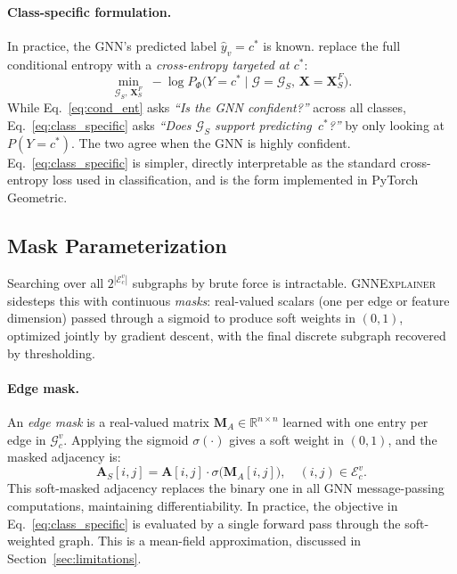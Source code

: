 \documentclass{article}
\newcommand{\GNNEx}{\textsc{GNNExplainer}\xspace}
\newcommand{\reals}{\mathbb{R}}
\newcommand{\calG}{\mathcal{G}}
\newcommand{\calE}{\mathcal{E}}
\newcommand{\bfA}{\mathbf{A}}
\newcommand{\bfX}{\mathbf{X}}
\newcommand{\bfM}{\mathbf{M}}
\newcommand{\sigmoid}{\sigma}
\theoremstyle{definition}
\begin{document}
\paragraph{Class-specific formulation.}
In practice, the GNN's predicted label $\hat{y}_v = c^*$ is known.
\citet{ying2019gnnexplainer} replace the full conditional entropy with a
\emph{cross-entropy targeted at $c^*$}:
\begin{equation}
  \min_{\calG_S,\, \bfX_S^F}\;
  -\log P_\Phi\bigl(Y\!=\!c^* \mid \calG\!=\!\calG_S,\,
  \bfX\!=\!\bfX_S^F\bigr).
  \label{eq:class_specific}
\end{equation}
While Eq.~\eqref{eq:cond_ent} asks \emph{``Is the GNN confident?''} across all
classes, Eq.~\eqref{eq:class_specific} asks \emph{``Does $\calG_S$ support
predicting~$c^*$?''} by only looking at $P(Y\!=\!c^*)$. The two agree when
the GNN is highly confident. Eq.~\eqref{eq:class_specific} is simpler,
directly interpretable as the standard cross-entropy loss used in
classification, and is the form implemented in PyTorch Geometric.

\subsection{Mask Parameterization}
\label{subsec:maskparam}

Searching over all $2^{|\calE_c^v|}$ subgraphs by brute force is intractable.
\GNNEx sidesteps this with continuous \emph{masks}: real-valued scalars (one
per edge or feature dimension) passed through a sigmoid to produce soft
weights in $(0,1)$, optimized jointly by gradient descent, with the final
discrete subgraph recovered by thresholding.

\paragraph{Edge mask.}
An \emph{edge mask} is a real-valued matrix $\bfM_A \in \reals^{n \times n}$
learned with one entry per edge in $\calG_c^v$. Applying the sigmoid $\sigmoid(\cdot)$
gives a soft weight in $(0,1)$, and the masked adjacency is:
\begin{equation}
  \bfA_S[i,j] = \bfA[i,j] \cdot \sigmoid\!\bigl(\bfM_A[i,j]\bigr),
  \quad (i,j) \in \calE_c^v.
  \label{eq:edge_mask}
\end{equation}
This soft-masked adjacency replaces the binary one in all GNN message-passing
computations, maintaining differentiability. In practice, the objective in
Eq.~\eqref{eq:class_specific} is evaluated by a single forward pass through
the soft-weighted graph. This is a mean-field approximation, discussed in
Section~\ref{sec:limitations}.
\end{document}
